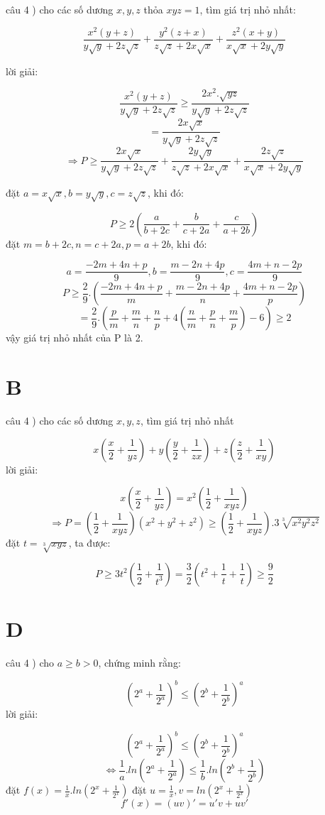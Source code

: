 \documentclass{article}
\begin{document}
câu 4
) cho các số dương $x,y,z$ thỏa $xyz=1$, tìm giá trị nhỏ nhất:

\[\frac{x^2(y+z)}{y\sqrt{y}+2z\sqrt{z}}+\frac{y^2(z+x)}{z\sqrt{z}+2x\sqrt{x}}+\frac{z^2(x+y)}{x\sqrt{x}+2y\sqrt{y}}\]

lời giải: 

\[\frac{x^2(y+z)}{y\sqrt{y}+2z\sqrt{z}}\geq\frac{2x^2.\sqrt{yz}}{y\sqrt{y}+2z\sqrt{z}}\]
\[=\frac{2x\sqrt{x}}{y\sqrt{y}+2z\sqrt{z}}\]
\[\Rightarrow P\geq\frac{2x\sqrt{x}}{y\sqrt{y}+2z\sqrt{z}}+\frac{2y\sqrt{y}}{z\sqrt{z}+2x\sqrt{x}}+\frac{2z\sqrt{z}}{x\sqrt{x}+2y\sqrt{y}}\]

đặt $a=x\sqrt{x},b=y\sqrt{y},c=z\sqrt{z}$, khi đó:

\[P\geq2(\frac{a}{b+2c}+\frac{b}{c+2a}+\frac{c}{a+2b})\]
đặt $m=b+2c,n=c+2a,p=a+2b$, khi đó:

\[a=\frac{-2m + 4n + p}{9}, b=\frac{m - 2n + 4p}{9}, c=\frac{4m + n - 2p}{9}\]
\[P\geq\frac{2}{9}.(\frac{-2m + 4n + p}{m}+\frac{m - 2n + 4p}{n}+\frac{4m + n - 2p}{p})\]
\[=\frac{2}{9}.(\frac{p}{m}+\frac{m}{n}+\frac{n}{p}+4(\frac{n}{m}+\frac{p}{n}+\frac{m}{p})-6)\geq2\]
vậy giá trị nhỏ nhất của P là 2.

\section*{B}

câu 4
) cho các số dương $x,y,z$, tìm giá trị nhỏ nhất

\[x(\frac{x}{2}+\frac{1}{yz}) + y(\frac{y}{2}+\frac{1}{zx}) + z(\frac{z}{2}+\frac{1}{xy})\]
lời giải:

\[x(\frac{x}{2}+\frac{1}{yz}) = x^2(\frac{1}{2}+\frac{1}{xyz})\]
\[\Rightarrow P=(\frac{1}{2}+\frac{1}{xyz})(x^2+y^2+z^2)\geq (\frac{1}{2}+\frac{1}{xyz}).3\sqrt[3]{x^2y^2z^2}\]
đặt $t=\sqrt[3]{xyz}$, ta được:

\[P\geq 3t^2(\frac{1}{2}+\frac{1}{t^3})=\frac{3}{2}(t^2+\frac{1}{t}+\frac{1}{t})\geq\frac{9}{2}\]
\section*{D}


câu 4
) cho $a\geq b >0$, chứng minh rằng:

\[(2^a+\frac{1}{2^a})^b \leq (2^b+\frac{1}{2^b})^a \]
lời giải: 

\[(2^a+\frac{1}{2^a})^b \leq (2^b+\frac{1}{2^b})^a \]
\[\Leftrightarrow \frac{1}{a}.ln(2^a+\frac{1}{2^a}) \leq \frac{1}{b}.ln(2^b+\frac{1}{2^b})\]
đặt $f(x)=\frac{1}{x}.ln(2^x+\frac{1}{2^x})$
đặt $u=\frac{1}{x}, v=ln(2^x+\frac{1}{2^x})$
\[f'(x) = (uv)'=u'v + uv'\]
\end{document}
